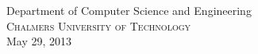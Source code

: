 \begin{titlepage}
  \begin{center}
    \HRule \\[0.4cm]
    {\huge \bfseries \mytitle{}}
    \HRule \\[1.5cm]

    \myname{}
    \vfill
        {\large Department of Computer Science and Engineering\\ 
          \textsc{Chalmers University of Technology}\\
          May 29, 2013}
  \end{center}
\end{titlepage}

